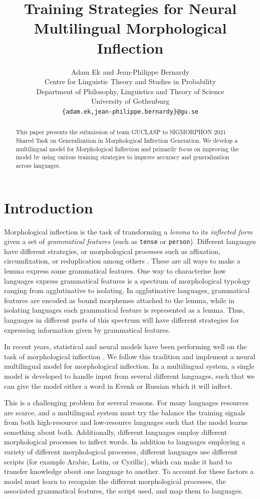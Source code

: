 \documentclass[11pt,a4paper]{article}
\title{Training Strategies for Neural Multilingual Morphological Inflection}
\author{Adam Ek and Jean-Philippe Bernardy \\
	Centre for Linguistic Theory and Studies in Probability \\
	Department of Philosophy, Linguistics and Theory of Science \\
	University of Gothenburg \\
	\texttt{\{adam.ek,jean-philippe.bernardy\}@gu.se} \\}
\date{}
\begin{document}
\maketitle
\begin{abstract}
This paper presents the submission of team GUCLASP to SIGMORPHON 2021
Shared Task on Generalization in Morphological Inflection Generation.
We develop a multilingual model for Morphological Inflection and
primarily focus on improving the model by using various training
strategies to improve accuracy and generalization across languages.
\end{abstract}

\section{Introduction}

Morphological inflection is the task of transforming a \emph{lemma} to
its \emph{inflected form} given a set of \emph{grammatical features}
(such as \texttt{tense} or \texttt{person}).  Different languages have
different strategies, or morphological processes such as affixation,
circumfixation, or reduplication among others
\cite{haspelmath2013understanding}.  These are all ways to make a
lemma express some grammatical features.  One way to characterise
how languages express grammatical features is a spectrum of
morphological typology ranging from agglutinative to isolating. In
agglutinative languages, grammatical features are encoded as bound
morphemes attached to the lemma, while in isolating languages each
grammatical feature is represented as a lemma. Thus, languages in
different parts of this spectrum will have different strategies for
expressing information given by grammatical features.

In recent years, statistical and neural models have been performing
well on the task of morphological inflection
\cite{DBLP:conf/eacl/SmitVGK14, kann2016med,
DBLP:conf/conll/MakarovRC17, sharma-etal-2018-iit}. We follow this
tradition and implement a neural multilingual model for morphological
inflection. In a multilingual system, a single model is developed to
handle input from several different languages, such that we can give
the model either a word in Evenk or Russian which it will inflect.

This is a challenging problem for several reasons. For many languages
resources are scarce, and a multilingual system must try the balance
the training signals from both high-resource and low-resource
languages such that the model learns something about both.
Additionally, different languages employ different morphological
processes to inflect words. In addition to languages employing a
variety of different morphological processes, different languages use
different scripts (for example Arabic, Latin, or Cyrillic), which can
make it hard to transfer knowledge about one language to another.  To
account for these factors a model must learn to recognize the
different morphological processes, the associated grammatical
features, the script used, and map them to languages.
\end{document}
